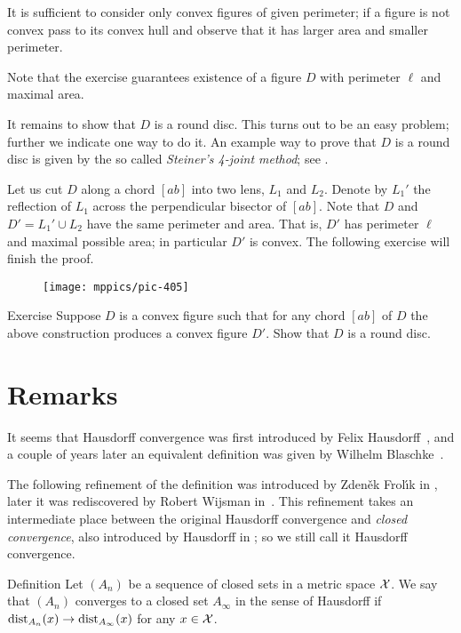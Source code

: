It is sufficient to consider only convex figures of given perimeter; if a figure is not convex pass to its convex hull and observe that it has larger area and smaller perimeter.


Note that the exercise guarantees existence of a figure $D$ with perimeter $\ell$ and maximal area.

It remains to show that $D$ is a round disc.
This turns out to be an easy problem;
further we indicate one way to do it.
An example way to prove that $D$ is a round disc is given by the so called {}\emph{Steiner's 4-joint method}; see \cite{blaschke}.


Let us cut $D$ along a chord $[ab]$ into two lens, $L_1$ and $L_2$.
Denote by $L_1'$ the reflection of $L_1$ across the perpendicular bisector of $[ab]$.
Note that $D$ and $D'=L_1'\cup L_2$ have the same perimeter and area.
That is, $D'$ has perimeter $\ell$ and maximal possible area;
in particular $D'$ is convex.
The following exercise will finish the proof.
\qeds

{

\begin{wrapfigure}{o}{50 mm}
\vskip-0mm
\centering
\texttt{[image: mppics/pic-405]}
\end{wrapfigure}

\begin{thm}{Exercise}
Suppose $D$ is a convex figure such that for any chord $[ab]$ of $D$ the above construction produces a convex figure $D'$.
Show that $D$ is a round disc.
\end{thm}


}

\section{Remarks}\label{sec:H-variation}

It seems that Hausdorff convergence was first introduced by Felix Hausdorff~\cite{hausdorff},
and a couple of years later an equivalent definition was given by Wilhelm Blaschke~\cite{blaschke}.

The following refinement of the definition was introduced by  Zden\v{e}k Frol\'{\i}k in \cite{frolik},
later it was rediscovered by Robert Wijsman in~\cite{wijsman}.  
This refinement takes an intermediate place between the original Hausdorff convergence and {}\emph{closed convergence}, also introduced by Hausdorff in \cite{hausdorff};
so we still call it Hausdorff convergence.

\begin{thm}{Definition}\label{def:gen-Haus-conv}
Let $(A_n)$ be a sequence of closed sets in a metric space $\mathcal{X}$.
We say that $(A_n)$ converges to a closed set $A_\infty$ in the sense of Hausdorff if $\mathrm{dist}_{A_n}(x)\to \mathrm{dist}_{A_\infty}(x)$ for any $x\in\mathcal{X}$.
\end{thm}

